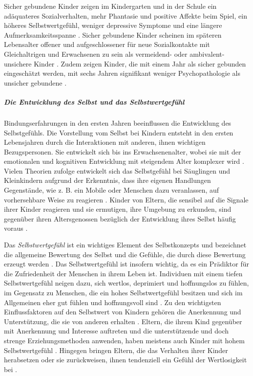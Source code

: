 Sicher gebundene Kinder zeigen im Kindergarten und in der Schule ein adäquateres Sozialverhalten, mehr Phantasie und positive Affekte beim Spiel, ein höheres Selbstwertgefühl, weniger depressive Symptome und eine längere Aufmerksamkeitsspanne \nohyphens{\cite{Dornes1993, Zeanah1994}}. Sicher gebundene Kinder scheinen im späteren Lebensalter offener und aufgeschlossener für neue Sozialkontakte mit Gleichaltrigen und Erwachsenen zu sein als vermeidend- oder ambivalent-unsichere Kinder \cite{Resch1999}. Zudem zeigen Kinder, die mit einem Jahr als sicher gebunden eingeschätzt werden, mit sechs Jahren signifikant weniger Psychopathologie als unsicher gebundene \cite{Lewis1984}.

\subparagraph{Die Entwicklung des Selbst und das Selbstwertgefühl}\label{par:EntwSelbst}
Bindungserfahrungen in den ersten Jahren beeinflussen die Entwicklung des Selbstgefühls. Die Vorstellung vom Selbst bei Kindern entsteht in den ersten Lebensjahren durch die Interaktionen mit anderen, ihnen wichtigen Bezugspersonen. Sie entwickelt sich bis ins Erwachsenenalter, wobei sie mit der emotionalen und kognitiven Entwicklung mit steigendem Alter komplexer wird \cite[S.~602 ff.]{Siegler2008}. Vielen Theorien zufolge entwickelt sich das Selbstgefühl bei Säuglingen und Kleinkindern aufgrund der Erkenntnis, dass ihre eigenen Handlungen Gegenstände, wie z. B. ein Mobile oder Menschen dazu veranlassen, auf vorhersehbare Weise zu reagieren \cite{Harter1998}. Kinder von Eltern, die sensibel auf die Signale ihrer Kinder reagieren und sie ermutigen, ihre Umgebung zu erkunden, sind gegenüber ihren Altersgenossen bezüglich der Entwicklung ihres Selbst häufig voraus \cite{Pipp1992}. 

Das \textit{Selbstwertgefühl} ist ein wichtiges Element des Selbstkonzepts und bezeichnet die allgemeine Bewertung des Selbst und die Gefühle, die durch diese Bewertung erzeugt werden \cite{Crocker2001}. Das Selbstwertgefühl ist insofern wichtig, da es ein Prädiktor für die Zufriedenheit der Menschen in ihrem Leben ist. Individuen mit einem tiefen Selbstwertgefühl neigen dazu, sich wertlos, deprimiert und hoffnungslos zu fühlen, im Gegensatz zu Menschen, die ein hohes Selbstwertgefühl besitzen und sich im Allgemeinen eher gut fühlen und hoffnungsvoll sind \cite{Harter1999}. Zu den wichtigsten Einflussfaktoren auf den Selbstwert von Kindern gehören die Anerkennung und Unterstützung, die sie von anderen erhalten \cite{Siegler2008}. Eltern, die ihrem Kind gegenüber mit Anerkennung und Interesse auftreten und die unterstützende und doch strenge Erziehungsmethoden anwenden, haben meistens auch Kinder mit hohem Selbstwertgefühl \cite{Feiring1996}. Hingegen bringen Eltern, die das Verhalten ihrer Kinder herabsetzen oder sie zurückweisen, ihnen tendenziell ein Gefühl der Wertlosigkeit bei \cite{Harter1999}. 


